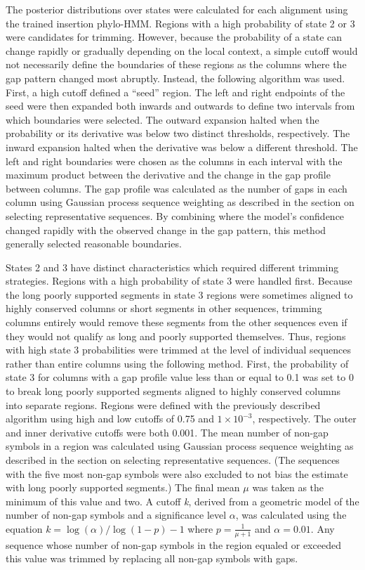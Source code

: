 The posterior distributions over states were calculated for each alignment using the trained insertion phylo-HMM. Regions with a high probability of state 2 or 3 were candidates for trimming. However, because the probability of a state can change rapidly or gradually depending on the local context, a simple cutoff would not necessarily define the boundaries of these regions as the columns where the gap pattern changed most abruptly. Instead, the following algorithm was used. First, a high cutoff defined a ``seed'' region. The left and right endpoints of the seed were then expanded both inwards and outwards to define two intervals from which boundaries were selected. The outward expansion halted when the probability or its derivative was below two distinct thresholds, respectively. The inward expansion halted when the derivative was below a different threshold. The left and right boundaries were chosen as the columns in each interval with the maximum product between the derivative and the change in the gap profile between columns. The gap profile was calculated as the number of gaps in each column using Gaussian process sequence weighting as described in the section on selecting representative sequences. By combining where the model’s confidence changed rapidly with the observed change in the gap pattern, this method generally selected reasonable boundaries.

 States 2 and 3 have distinct characteristics which required different trimming strategies. Regions with a high probability of state 3 were handled first. Because the long poorly supported segments in state 3 regions were sometimes aligned to highly conserved columns or short segments in other sequences, trimming columns entirely would remove these segments from the other sequences even if they would not qualify as long and poorly supported themselves. Thus, regions with high state 3 probabilities were trimmed at the level of individual sequences rather than entire columns using the following method. First, the probability of state 3 for columns with a gap profile value less than or equal to 0.1 was set to 0 to break long poorly supported segments aligned to highly conserved columns into separate regions. Regions were defined with the previously described algorithm using high and low cutoffs of 0.75 and $1 \times 10^{-3}$, respectively. The outer and inner derivative cutoffs were both 0.001. The mean number of non-gap symbols in a region was calculated using Gaussian process sequence weighting as described in the section on selecting representative sequences. (The sequences with the five most non-gap symbols were also excluded to not bias the estimate with long poorly supported segments.) The final mean $\mu$ was taken as the minimum of this value and two. A cutoff \textit{k}, derived from a geometric model of the number of non-gap symbols and a significance level $\alpha$, was calculated using the equation $k = \log(\alpha) / \log(1 - p) - 1$ where $p = \frac{1}{\mu + 1}$ and $\alpha = 0.01$. Any sequence whose number of non-gap symbols in the region equaled or exceeded this value was trimmed by replacing all non-gap symbols with gaps.

